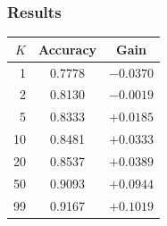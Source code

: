 \subsubsection{Results}

\begin{center}
\begin{tabular}{rcc}
\toprule
$K$ & Accuracy & Gain \\
\midrule
1 & 0.7778 & $-0.0370$ \\
2 & 0.8130 & $-0.0019$ \\
5 & 0.8333 & $+0.0185$ \\
10 & 0.8481 & $+0.0333$ \\
20 & 0.8537 & $+0.0389$ \\
50 & 0.9093 & $+0.0944$ \\
99 & 0.9167 & $+0.1019$ \\
\bottomrule
\end{tabular}
\end{center}
